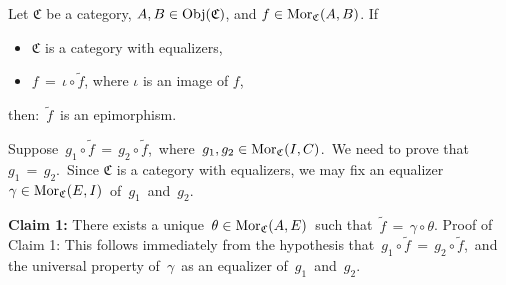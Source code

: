 
\vskip 0.5cm
\begin{lemma}\label{fTildeIsEpimorphism}
\mbox{}
\vskip 0.1cm
\noindent
Let $\mathfrak{C}$ be a category, $A, B \in \textnormal{Obj}(\mathfrak{C})$, and $f \in \textnormal{Mor}_{\mathfrak{C}}(A,B)$.
\vskip 0.1cm
\noindent
If
\begin{itemize}
\item
	$\mathfrak{C}$ is a category with equalizers,
\item
	$f \,=\, \iota \circ \widetilde{f}$, where $\iota$ is an image of $f$,
\end{itemize}
then: \,$\widetilde{f}$\, is an epimorphism.
\end{lemma}
\proof
Suppose \,$g_{1} \circ \widetilde{f} \,=\, g_{2} \circ \widetilde{f}$,\,
where \,$g_{1}, g_{2} \in \textnormal{Mor}_{\mathfrak{C}}(I,C)$.\,
We need to prove that \,$g_{1} \,=\, g_{2}$.\,
\vskip 0.3cm
\noindent
Since $\mathfrak{C}$ is a category with equalizers,
we may fix an equalizer \,$\gamma \in \textnormal{Mor}_{\mathfrak{C}}(E,I)$\, of \,$g_{1}$\, and \,$g_{2}$.
\begin{center}
\end{center}

\vskip 0.3cm
\noindent
\textbf{Claim 1:}\;\; There exists a unique \,$\theta \in \textnormal{Mor}_{\mathfrak{C}}(A,E)$\, such that \,$\widetilde{f} \,=\, \gamma \circ \theta$.
\vskip 0.1cm
\noindent
Proof of Claim 1:\; This follows immediately from the hypothesis that
\,$g_{1} \circ \widetilde{f} \,=\, g_{2} \circ \widetilde{f}$,\,
and the universal property of \,$\gamma$\, as an equalizer of \,$g_{1}$\, and \,$g_{2}$.


